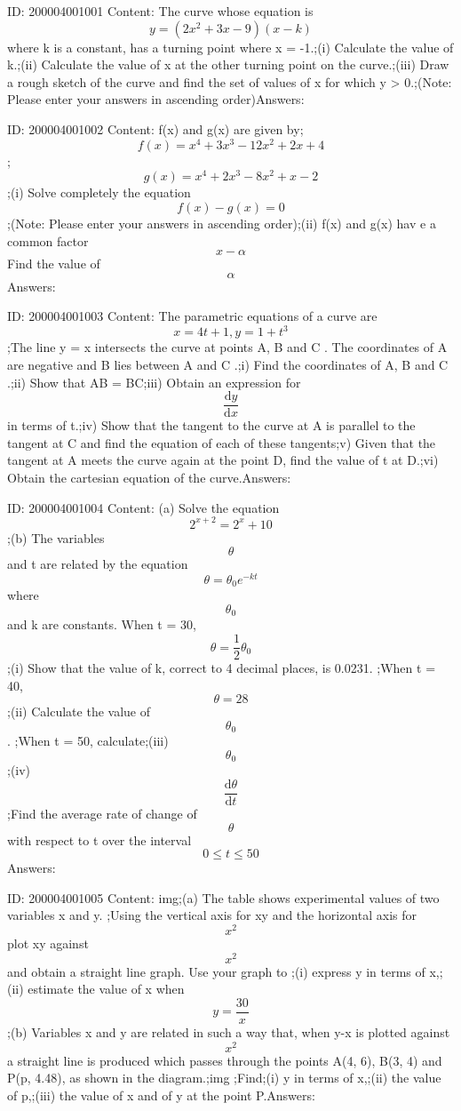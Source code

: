 \documentclass{article}
\begin{document}
ID: 200004001001
Content:
The curve whose equation is \[y=(2x^2+3x-9)(x-k)\] where k is a constant, has a turning point where x = -1.;(i)	Calculate the value of k.;(ii)	Calculate the value of x at the other turning point on the curve.;(iii)	Draw a rough sketch of the curve and find the set of values of x for which y > 0.;(Note: Please enter your answers in ascending order)Answers:

ID: 200004001002
Content:
f(x) and g(x) are given by; \[f(x)=x^4+3x^3-12x^2+2x+4\]; \[g(x)=x^4+2x^3-8x^2+x-2\];(i)	Solve completely the equation \[f(x) - g(x) = 0\];(Note: Please enter your answers in ascending order);(ii) f(x) and g(x) hav e a common factor \[x-\alpha\] Find the value of \[\alpha\]Answers:

ID: 200004001003
Content:
The parametric equations of a curve are \[x=4t+1,y=1+t^3\];The line y = x intersects the curve at points A, B and C . The coordinates of A are negative and B lies between A and C .;i) Find the coordinates of A, B and C .;ii) Show that AB = BC;iii) Obtain an expression for \[\frac{\mathrm{d} y}{\mathrm{d} x}\] in terms of t.;iv) Show that the tangent to the curve at A is parallel to the tangent at C and find the equation of each of these tangents;v) Given that the tangent at A meets the curve again at the point D, find the value of t at D.;vi) Obtain the cartesian equation of the curve.Answers:

ID: 200004001004
Content:
(a)	Solve the equation \[2^{x+2}=2^x+10\];(b)	The variables \[\theta\] and t are related by the equation \[\theta=\theta_0e^{-kt}\] where \[\theta_0\] and k are constants. When t = 30, \[\theta=\frac{1}{2}\theta_0\];(i) Show that the value of k, correct to 4 decimal places, is 0.0231. ;When t = 40, \[\theta=28\];(ii) Calculate the value of \[\theta_0\]. ;When t = 50, calculate;(iii) \[\theta_0\];(iv) \[\frac{\mathrm{d} \theta}{\mathrm{d} t}\];Find the average rate of change of \[\theta\] with respect to t over the interval \[0\leq t\leq 50\]Answers:

ID: 200004001005
Content:
img;(a) The table shows experimental values of two variables x and y. ;Using the vertical axis for xy and the horizontal axis for \[x^2\] plot xy against \[x^2\] and obtain a straight line graph. Use your graph to ;(i)	express y in terms of x,;(ii)	estimate the value of x when \[y=\frac{30}{x}\];(b)	Variables x and y are related in such a way that, when y-x is plotted against \[x^2\] a straight line is produced which passes through the points A(4, 6), B(3, 4) and P(p, 4.48), as shown in the diagram.;img ;Find;(i)	y in terms of x,;(ii)	the value of p,;(iii)	the value of x and of y at the point P.Answers:
\end{document}
